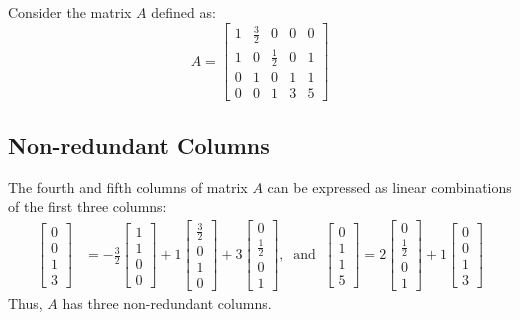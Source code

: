 \documentclass[12pt]{article}
\begin{document}
\begin{tcolorbox}[colback=gray!5!white, colframe=black!75!black, title=Figure 1. Example of the Equality of Row Rank and Column Rank, left=5pt, right=5pt, top=10pt, bottom=10pt, enlarge right by=-.5mm]
Consider the matrix $A$ defined as:
\[
A = \begin{bmatrix}
    1 & \frac{3}{2} & 0 & 0 & 0\\
    1 & 0 & \frac{1}{2} & 0 & 1\\
    0 & 1 & 0 & 1 & 1 \\
    0 & 0 & 1 & 3 & 5
\end{bmatrix}
\]

\subsection*{Non-redundant Columns}
The fourth and fifth columns of matrix $A$ can be expressed as linear combinations of the first three columns:
\begin{align*}
\begin{bmatrix}
    0 \\
    0 \\
    1 \\
    3
\end{bmatrix} &= -\frac{3}{2} \begin{bmatrix}
    1 \\
    1\\
    0 \\
    0
\end{bmatrix}
+ 1 \begin{bmatrix}
    \frac{3}{2} \\
    0\\
    1 \\
    0
\end{bmatrix}
+ 3 \begin{bmatrix}
    0 \\
    \frac{1}{2}\\
    0 \\
    1
\end{bmatrix}, \ \text{ and } \ 
\begin{bmatrix}
    0 \\
    1 \\
    1 \\
    5
\end{bmatrix} = 2 \begin{bmatrix}
    0 \\
    \frac{1}{2}\\
    0 \\
    1
\end{bmatrix}
+ 1 \begin{bmatrix}
    0 \\
    0\\
    1\\
    3
\end{bmatrix}
\end{align*}
Thus, $A$ has three non-redundant columns. 

\end{tcolorbox}
\end{document}
